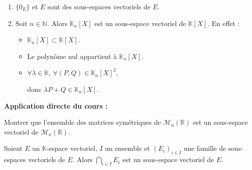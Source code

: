 \documentclass[french,11pt,twoside]{VcCours}
\newenvironment{ApplicationDirecte}{\textbf{Application directe du cours :}

}{}
\begin{document}
\begin{Exemples}
\begin{enumerate}
\item $\lbrace 0_E \rbrace$ et $E$ sont des sous-espaces vectoriels de $E$.
\item Soit $n \in \mathbb{N}$. Alors $\mathbb{K}_n[X]$ est un sous-espace vectoriel de $\mathbb{K}[X]$. En effet :
\begin{itemize}
\item $\mathbb{K}_n[X] \subset \mathbb{K}[X]$.
\item Le polynôme nul appartient à $\mathbb{K}_n[X]$.
\item $\forall \lambda \in \mathbb{K}$, $\forall (P,Q) \in \mathbb{K}_n[X]^2$,

\vspace{1cm}

donc $\lambda P + Q \in \mathbb{K}_n[X]$.
\end{itemize}
\end{enumerate}
\end{Exemples}

\begin{ApplicationDirecte} Montrer que l'ensemble des matrices symétriques de $\mathcal{M}_n(\mathbb{R})$ est un sous-espace vectoriel de $\mathcal{M}_n(\mathbb{R})$. \end{ApplicationDirecte}

\begin{Proposition}{}
Soient $E$ un $\mathbb{K}$-espace vectoriel, $I$ un ensemble et $(E_i)_{i \in I}$ une famille de sous-espaces vectoriels de $E$. Alors $\bigcap_{i \in I} E_i$ est un sous-espace vectoriel de $E$.
\end{Proposition}

\begin{Demonstration}{}
\vspace{6cm}

\end{Demonstration}
\end{document}
